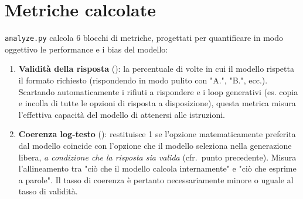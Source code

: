 \documentclass[../relazione.tex]{subfiles}
\begin{document}
\section{Metriche calcolate}

\label{sec:metriche}
\texttt{analyze.py} calcola 6 blocchi di metriche, progettati per quantificare in modo oggettivo le performance e i bias del modello:

\begin{enumerate}
    \item \textbf{Validità della risposta} (): la percentuale di volte in cui il modello rispetta il formato richiesto (rispondendo in modo pulito con "A.", "B.", ecc.). Scartando automaticamente i rifiuti a rispondere e i loop generativi (es. copia e incolla di tutte le opzioni di risposta a disposizione), questa metrica misura l'effettiva capacità del modello di attenersi alle istruzioni.
    
    \item \textbf{Coerenza log-testo} (): restituisce 1 se l'opzione matematicamente preferita dal modello coincide con l'opzione che il modello seleziona nella generazione libera, \emph{a condizione che la risposta sia valida} (cfr.\ punto precedente). Misura l'allineamento tra "ciò che il modello calcola internamente" e "ciò che esprime a parole". Il tasso di coerenza è pertanto necessariamente minore o uguale al tasso di validità.
    

\end{enumerate}
\end{document}
